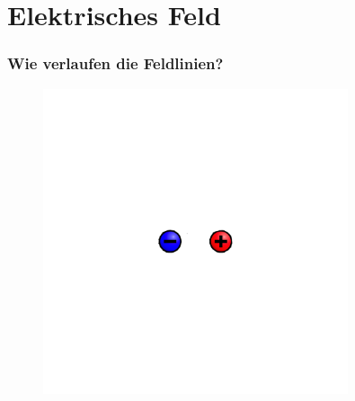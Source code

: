 \section*{Elektrisches Feld}

\begin{frame}
  \frametitle{Wie verlaufen die Feldlinien?}
  \begin{center}
    \begin{figure}
      \includegraphics[width=0.8\textwidth,height=.75\textheight,keepaspectratio]{a08/VFPt_dipole_electric_ohne.png}
    \end{figure}
  \end{center}
\end{frame}

